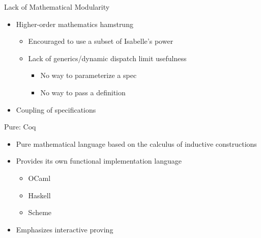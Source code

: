 \documentclass{beamer}
\begin{document}
\begin{frame}{Lack of Mathematical Modularity}
	\begin{itemize}
		\item Higher-order mathematics hamstrung
		\begin{itemize}
			\item Encouraged to use a subset of Isabelle's power
			\item Lack of generics/dynamic dispatch limit usefulness
			\begin{itemize}
				\item No way to parameterize a spec
				\item No way to pass a definition
			\end{itemize}
		\end{itemize}
		\item Coupling of specifications
	\end{itemize}
\end{frame}


\begin{frame}{Pure: Coq}
	\begin{itemize}
		\item Pure mathematical language based on the calculus of inductive constructions
		\item Provides its own functional implementation language
		\begin{itemize}
			\item OCaml
			\item Haskell
			\item Scheme
		\end{itemize}
		\item Emphasizes interactive proving
	\end{itemize}
\end{frame}


\begin{frame}
	
	
	
\end{frame}


\begin{frame}
	
\end{frame}
\end{document}
